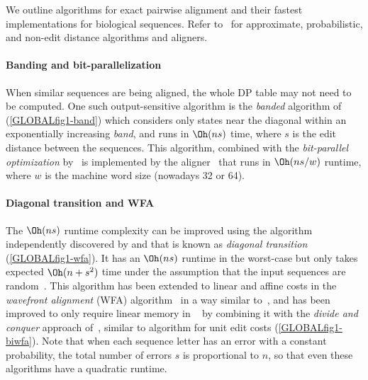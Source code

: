 We outline algorithms for exact pairwise alignment and their fastest implementations for
biological sequences. Refer to~\citet{kucherov2019evolution} for approximate,
probabilistic, and non-edit distance algorithms and aligners.

\paragraph{Banding and bit-parallelization} When similar sequences are being
aligned, the whole DP table may not need to be computed. One such
output-sensitive algorithm is the \emph{banded} algorithm of
\citet{ukkonen1985algorithms} (\cref{GLOBALfig1-band}) which considers only states
near the diagonal within an exponentially increasing \emph{band}, and runs in
$\Oh(ns)$ time, where $s$ is the edit distance between the sequences. This
algorithm, combined with the \emph{bit-parallel optimization}
by~\citet{myers1999fast} is implemented by the \edlib
aligner~\citep{vsovsic2017edlib} that runs in $\Oh(ns/w)$ runtime, where $w$ is
the machine word size (nowadays 32 or 64).

\paragraph{Diagonal transition and WFA}
The $\Oh(ns)$ runtime complexity can be improved using the algorithm independently
discovered by \citet{ukkonen1985algorithms} and \citet{myers1986ano} that is
known as \emph{diagonal transition} \citep{navarro2001guided} (\cref{GLOBALfig1-wfa}).
It has an $\Oh(ns)$ runtime in the worst-case but only takes expected
$\Oh(n+s^2)$ time under the assumption that the input sequences are
random~\citep{myers1986ano}. This algorithm has been extended to linear and
affine costs in the \emph{wavefront alignment} (WFA)
algorithm~\citep{marco2021fast} in a way similar to~\citet{gotoh1982improved},
and has been improved to only require linear memory in
\wfa~\citep{marco2022optimal} by combining it with the \emph{divide and conquer}
approach of~\citet{hirschberg1975linear}, similar to \citet{myers1986ano}
algorithm for unit edit costs (\cref{GLOBALfig1-biwfa}).
Note that when each sequence letter has an error with a constant probability,
the total number of errors $s$ is proportional to $n$, so that even these
algorithms have a quadratic runtime.

